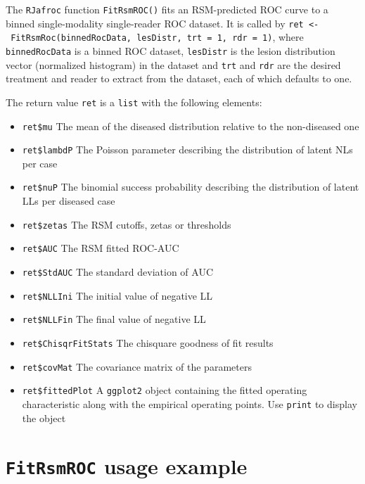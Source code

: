 \documentclass[
]{book}
\begin{document}
The \texttt{RJafroc} function \texttt{FitRsmROC()} fits an RSM-predicted ROC curve to a binned single-modality single-reader ROC dataset. It is called by \texttt{ret\ \textless{}-\ FitRsmRoc(binnedRocData,\ lesDistr,\ trt\ =\ 1,\ rdr\ =\ 1)}, where \texttt{binnedRocData} is a binned ROC dataset, \texttt{lesDistr} is the lesion distribution vector (normalized histogram) in the dataset and \texttt{trt} and \texttt{rdr} are the desired treatment and reader to extract from the dataset, each of which defaults to one.

The return value \texttt{ret} is a \texttt{list} with the following elements:

\begin{itemize}
\item
  \texttt{ret\$mu} The mean of the diseased distribution relative to the non-diseased one
\item
  \texttt{ret\$lambdP} The Poisson parameter describing the distribution of latent NLs per case
\item
  \texttt{ret\$nuP} The binomial success probability describing the distribution of latent LLs per diseased case
\item
  \texttt{ret\$zetas} The RSM cutoffs, zetas or thresholds
\item
  \texttt{ret\$AUC} The RSM fitted ROC-AUC
\item
  \texttt{ret\$StdAUC} The standard deviation of AUC
\item
  \texttt{ret\$NLLIni} The initial value of negative LL
\item
  \texttt{ret\$NLLFin} The final value of negative LL
\item
  \texttt{ret\$ChisqrFitStats} The chisquare goodness of fit results
\item
  \texttt{ret\$covMat} The covariance matrix of the parameters
\item
  \texttt{ret\$fittedPlot} A \texttt{ggplot2} object containing the fitted operating characteristic along with the empirical operating points. Use \texttt{print} to display the object
\end{itemize}

\hypertarget{rsm-fitting-fitrsmroc-usage-example}{%
\section{\texorpdfstring{\texttt{FitRsmROC} usage example}{FitRsmROC usage example}}\label{rsm-fitting-fitrsmroc-usage-example}}
\end{document}
